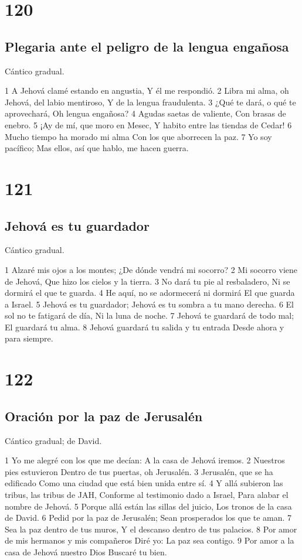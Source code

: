 \chapter{120}

\section*{Plegaria ante el peligro de la lengua engañosa}

Cántico gradual.

1 A Jehová clamé estando en angustia,
Y él me respondió.
2 Libra mi alma, oh Jehová, del labio mentiroso,
Y de la lengua fraudulenta.
3 ¿Qué te dará, o qué te aprovechará,
Oh lengua engañosa?
4 Agudas saetas de valiente,
Con brasas de enebro.
5 ¡Ay de mí, que moro en Mesec,
Y habito entre las tiendas de Cedar!
6 Mucho tiempo ha morado mi alma
Con los que aborrecen la paz.
7 Yo soy pacífico;
Mas ellos, así que hablo, me hacen guerra.

\chapter{121}

\section*{Jehová es tu guardador}

Cántico gradual.

1 Alzaré mis ojos a los montes;
¿De dónde vendrá mi socorro?
2 Mi socorro viene de Jehová,
Que hizo los cielos y la tierra.
3 No dará tu pie al resbaladero,
Ni se dormirá el que te guarda.
4 He aquí, no se adormecerá ni dormirá
El que guarda a Israel.
5 Jehová es tu guardador;
Jehová es tu sombra a tu mano derecha.
6 El sol no te fatigará de día,
Ni la luna de noche.
7 Jehová te guardará de todo mal;
El guardará tu alma.
8 Jehová guardará tu salida y tu entrada
Desde ahora y para siempre.

\chapter{122}

\section*{Oración por la paz de Jerusalén}

Cántico gradual; de David.

1 Yo me alegré con los que me decían:
A la casa de Jehová iremos.
2 Nuestros pies estuvieron
Dentro de tus puertas, oh Jerusalén.
3 Jerusalén, que se ha edificado
Como una ciudad que está bien unida entre sí.
4 Y allá subieron las tribus, las tribus de JAH,
Conforme al testimonio dado a Israel,
Para alabar el nombre de Jehová.
5 Porque allá están las sillas del juicio,
Los tronos de la casa de David.
6 Pedid por la paz de Jerusalén;
Sean prosperados los que te aman.
7 Sea la paz dentro de tus muros,
Y el descanso dentro de tus palacios.
8 Por amor de mis hermanos y mis compañeros
Diré yo: La paz sea contigo.
9 Por amor a la casa de Jehová nuestro Dios
Buscaré tu bien.

